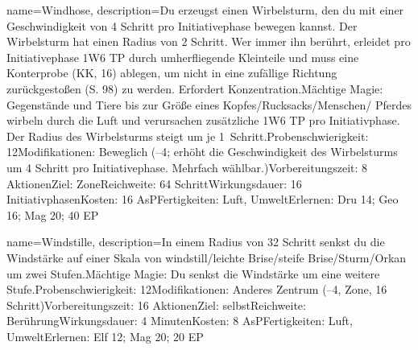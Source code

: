 {
    name={Windhose},
    description={Du erzeugst einen Wirbelsturm, den du mit einer Geschwindigkeit von 4 Schritt pro Initiativephase bewegen kannst. Der Wirbelsturm hat einen Radius von 2 Schritt. Wer immer ihn berührt, erleidet pro Initiativephase 1W6 TP durch umherfliegende Kleinteile und muss eine Konterprobe (KK, 16) ablegen, um nicht in eine zufällige Richtung zurückgestoßen (S. 98) zu werden. Erfordert Konzentration.\newline Mächtige Magie: Gegenstände und Tiere bis zur Größe eines Kopfes/Rucksacks/Menschen/ Pferdes wirbeln durch die Luft und verursachen zusätzliche 1W6 TP pro Initiativphase. Der Radius des Wirbelsturms steigt um je 1 Schritt.\newline Probenschwierigkeit: 12\newline Modifikationen: Beweglich (–4; erhöht die Geschwindigkeit des Wirbelsturms um 4 Schritt pro Initiativephase. Mehrfach wählbar.)\newline Vorbereitungszeit: 8 Aktionen\newline Ziel: Zone\newline Reichweite: 64 Schritt\newline Wirkungsdauer: 16 Initiativphasen\newline Kosten: 16 AsP\newline Fertigkeiten: Luft, Umwelt\newline Erlernen: Dru 14; Geo 16; Mag 20; 40 EP}
}


{
    name={Windstille},
    description={In einem Radius von 32 Schritt senkst du die Windstärke auf einer Skala von windstill/leichte Brise/steife Brise/Sturm/Orkan um zwei Stufen.\newline Mächtige Magie: Du senkst die Windstärke um eine weitere Stufe.\newline Probenschwierigkeit: 12\newline Modifikationen: Anderes Zentrum (–4, Zone, 16 Schritt)\newline Vorbereitungszeit: 16 Aktionen\newline Ziel: selbst\newline Reichweite: Berührung\newline Wirkungsdauer: 4 Minuten\newline Kosten: 8 AsP\newline Fertigkeiten: Luft, Umwelt\newline Erlernen: Elf 12; Mag 20; 20 EP}
}


